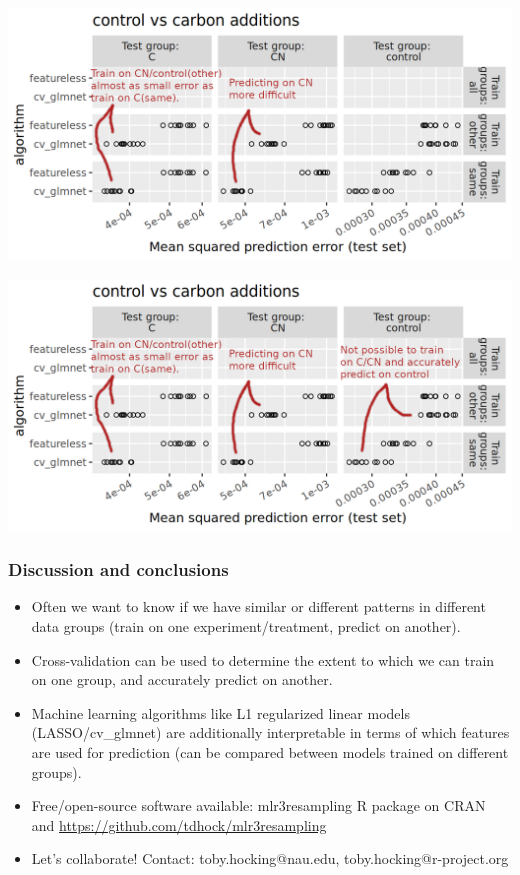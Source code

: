 \documentclass{beamer}
\begin{document}
\begin{frame}
  \includegraphics[width=\textwidth]{qsip_pc2_all_new-control.vs.carbon.additions.other.2.png}
\end{frame}

\begin{frame}
  \includegraphics[width=\textwidth]{qsip_pc2_all_new-control.vs.carbon.additions.other.3.png}
\end{frame}



\begin{frame}
  \frametitle{Discussion and conclusions}
  \begin{itemize}
  \item Often we want to know if we have similar or different patterns
    in different data groups (train on one experiment/treatment, predict
    on another).
  \item Cross-validation can be used to determine the extent to which
    we can train on one group, and accurately predict on another.
  \item Machine learning algorithms like L1 regularized linear models
    (LASSO/cv\_glmnet) are additionally interpretable in terms of which features
    are used for prediction (can be compared between models trained on
    different groups).
  \item Free/open-source software available: mlr3resampling R package
    on CRAN and \url{https://github.com/tdhock/mlr3resampling}
  \item Let's collaborate! Contact: toby.hocking@nau.edu, toby.hocking@r-project.org
  \end{itemize}
\end{frame}
\end{document}
